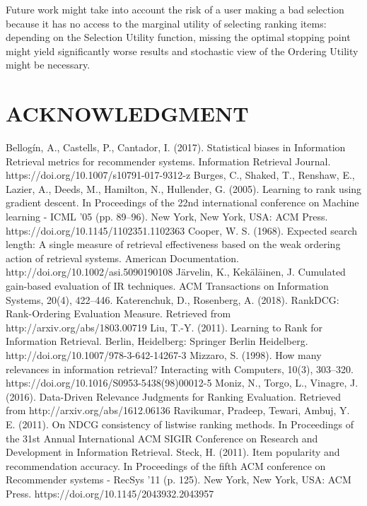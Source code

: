 \documentclass[a4paper, 10pt, conference]{ieeeconf}
\begin{document}
Future work might take into account the risk of a user making a bad selection
because it has no access to the marginal utility of selecting ranking items:
depending on the Selection Utility function, missing the optimal stopping point
might yield significantly worse results and stochastic view of the Ordering
Utility might be necessary.

\addtolength{\textheight}{-12cm}
\section*{ACKNOWLEDGMENT}

\begin{thebibliography}{99}
Bellogín, A., Castells, P., Cantador, I. (2017). Statistical biases in Information Retrieval metrics for recommender systems. Information Retrieval Journal. https://doi.org/10.1007/s10791-017-9312-z
Burges, C., Shaked, T., Renshaw, E., Lazier, A., Deeds, M., Hamilton, N., Hullender, G. (2005). Learning to rank using gradient descent. In Proceedings of the 22nd international conference on Machine learning - ICML ’05 (pp. 89–96). New York, New York, USA: ACM Press. https://doi.org/10.1145/1102351.1102363
Cooper, W. S. (1968). Expected search length: A single measure of retrieval effectiveness based on the weak ordering action of retrieval systems. American Documentation. http://doi.org/10.1002/asi.5090190108
Järvelin, K., Kekäläinen, J.
Cumulated gain-based evaluation of IR techniques. ACM Transactions on Information Systems, 20(4), 422–446.
Katerenchuk, D., Rosenberg, A. (2018). RankDCG: Rank-Ordering Evaluation Measure. Retrieved from http://arxiv.org/abs/1803.00719
Liu, T.-Y. (2011). Learning to Rank for Information Retrieval. Berlin, Heidelberg: Springer Berlin Heidelberg. http://doi.org/10.1007/978-3-642-14267-3
Mizzaro, S. (1998). How many relevances in information retrieval? Interacting with Computers, 10(3), 303–320. https://doi.org/10.1016/S0953-5438(98)00012-5
Moniz, N., Torgo, L., Vinagre, J. (2016). Data-Driven Relevance Judgments for Ranking Evaluation. Retrieved from http://arxiv.org/abs/1612.06136
Ravikumar, Pradeep, Tewari, Ambuj, Y. E. (2011). On NDCG consistency of listwise ranking methods. In Proceedings of the 31st Annual International ACM SIGIR Conference on Research and Development in Information Retrieval.
Steck, H. (2011). Item popularity and recommendation accuracy. In Proceedings of the fifth ACM conference on Recommender systems - RecSys ’11 (p. 125). New York, New York, USA: ACM Press. https://doi.org/10.1145/2043932.2043957

\end{thebibliography}
\end{document}
